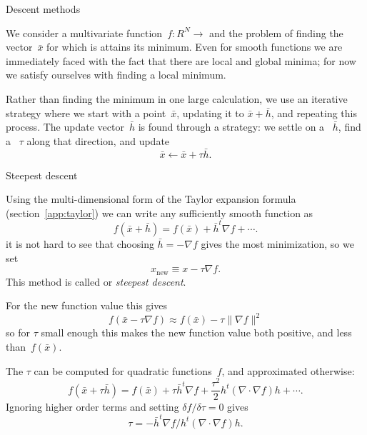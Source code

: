 
 {Descent methods}
\label{app::descent}

We consider a multivariate function~$f\colon R^N\rightarrow $ and the
problem of finding the vector~$\bar x$ for which is attains its
minimum. Even for smooth functions we are immediately faced with the
fact that there are local and global minima; for now we satisfy
ourselves with finding a local minimum.

Rather than finding the minimum in one large calculation, we use an
iterative strategy where we start with a point~$\bar x$,
updating it to $\bar x+\bar h$, and repeating this process.
The update vector~$\bar h$ is found through a 
strategy:
we settle on a ~$\bar h$,
find a ~$\tau$ along that direction, and update
\[ \bar x\leftarrow \bar x+\tau \bar h. \]

 {Steepest descent}

Using the multi-dimensional form of the Taylor expansion formula
(section~\ref{app:taylor}) we can write any sufficiently smooth
function as
\[ f(\bar x+\bar h) = f(\bar x) + \bar h^t \nabla f +\cdots. \]
it is not hard to see that choosing $\bar h=-\nabla f$ gives the most
minimization, so we set
\[ x_{\scriptstyle\mathrm{new}}\equiv x-\tau \nabla f. \]
This method is called 
or
\emph{steepest descent}.

For the new function value this gives
\[ f(\bar x - \tau \nabla f ) \approx f(\bar x) - \tau \| \nabla f \|^2 \]
so for $\tau$ small enough this makes the new function value both
positive, and less than~$f(\bar x)$.

The  $\tau$ can be computed for quadratic
functions~$f$, and approximated otherwise:
\[ f(\bar x+\tau\bar h) = f(\bar x) + \tau\bar h^t \nabla f +
\frac{\tau^2}2 h^t (\nabla\cdot\nabla f) h +\cdots. \]
Ignoring higher order terms and setting
$\delta f/\delta\tau=0$
gives
\[ \tau = - \bar h^t \nabla f / h^t (\nabla\cdot\nabla f) h. \]

